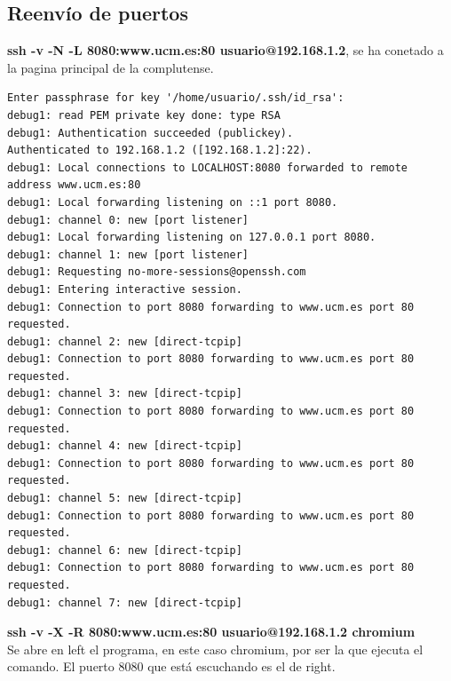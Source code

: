 \documentclass[11pt]{article}
\begin{document}
    \subsection{Reenvío de puertos}
      \par
      \textbf{ssh -v -N -L 8080:www.ucm.es:80 usuario@192.168.1.2}, se ha
      conetado a la pagina principal de la complutense.

\begin{lstlisting}
Enter passphrase for key '/home/usuario/.ssh/id_rsa':
debug1: read PEM private key done: type RSA
debug1: Authentication succeeded (publickey).
Authenticated to 192.168.1.2 ([192.168.1.2]:22).
debug1: Local connections to LOCALHOST:8080 forwarded to remote address www.ucm.es:80
debug1: Local forwarding listening on ::1 port 8080.
debug1: channel 0: new [port listener]
debug1: Local forwarding listening on 127.0.0.1 port 8080.
debug1: channel 1: new [port listener]
debug1: Requesting no-more-sessions@openssh.com
debug1: Entering interactive session.
debug1: Connection to port 8080 forwarding to www.ucm.es port 80 requested.
debug1: channel 2: new [direct-tcpip]
debug1: Connection to port 8080 forwarding to www.ucm.es port 80 requested.
debug1: channel 3: new [direct-tcpip]
debug1: Connection to port 8080 forwarding to www.ucm.es port 80 requested.
debug1: channel 4: new [direct-tcpip]
debug1: Connection to port 8080 forwarding to www.ucm.es port 80 requested.
debug1: channel 5: new [direct-tcpip]
debug1: Connection to port 8080 forwarding to www.ucm.es port 80 requested.
debug1: channel 6: new [direct-tcpip]
debug1: Connection to port 8080 forwarding to www.ucm.es port 80 requested.
debug1: channel 7: new [direct-tcpip]
\end{lstlisting}

      \bigskip
      \par
      \textbf{ssh -v -X -R 8080:www.ucm.es:80 usuario@192.168.1.2 chromium}\\
      Se abre en left el programa, en este caso chromium, por ser la que ejecuta
      el comando. El puerto 8080 que está escuchando es el de right.
\end{document}
